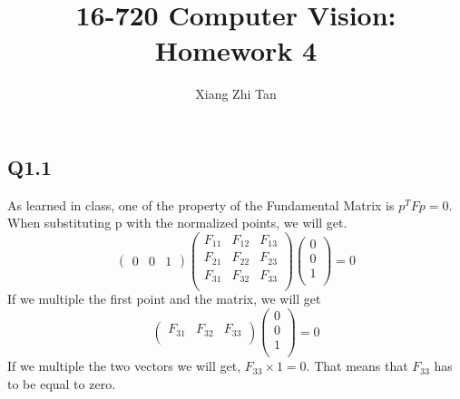 \documentclass{article}
\begin{document}
\title{16-720 Computer Vision: Homework 4}
\author{Xiang Zhi Tan}

\maketitle
\subsection*{Q1.1}
As learned in class, one of the property of the Fundamental Matrix is $p^TFp = 0$. When substituting p with the normalized points, we will get.
\begin{equation*}
\begin{pmatrix}
0 & 0 & 1
\end{pmatrix}
\begin{pmatrix}
F_{11}&F_{12}&F_{13}\\
F_{21}&F_{22}&F_{23}\\
F_{31}&F_{32}&F_{33}\\
\end{pmatrix}
\begin{pmatrix}
0\\
0\\
1\\
\end{pmatrix}
= 0
\end{equation*}
If we multiple the first point and the matrix, we will get
\begin{equation*}
\begin{pmatrix}
F_{31}&F_{32}&F_{33}\\
\end{pmatrix}
\begin{pmatrix}
0\\
0\\
1\\
\end{pmatrix}
= 0
\end{equation*}
If we multiple the two vectors we will get, $F_{33} \times 1 = 0$. That means that $F_{33}$ has to be equal to zero.
\end{document}
